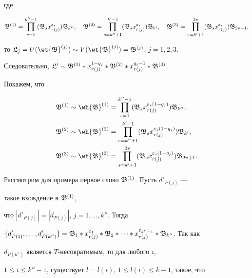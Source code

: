 где


$$


\frak B^{(1)}=\prod^{k''-1}_{s=1}(\frak B_s x^{\varepsilon_s}_{r(j)})


\frak B_{k''},\quad\frak B^{(2)}=\prod_{s=k''+1}^{k'-1}


(\frak B_s x^{\varepsilon_s}_{r(j)})\frak B_{k'},\quad


\frak B^{(3)}=\prod_{s=k'+1}^{2v}(\frak B_s


x^{\varepsilon_s}_{r(j)})\frak B_{2v+1},


$$


то $\frak L_j=U(\wt{\frak B}^{(j)})\sim


V(\wt{\frak B}^{(j)})=\frak B^{(j)}$, $j=1,2,3$.


Следовательно, $\frak L'\sim\frak B^{(1)}


*x^{1-q_j}_{r(j)}*\frak B^{(2)}*x^{q_j-1}_{r(j)}*\frak B^{(3)}$.


Покажем, что


\begin{align*}


\frak B^{(1)}\sim\wh {\frak B}^{(1)}&=\prod^{k''-1}_{s=1}


(\frak B_s x^{\varepsilon_s(1-q_j)}_{r(j)})\frak B_{k''},\\


\frak B^{(2)}\sim\wh{\frak B}^{(2)}&=


\prod^{k'-1}_{s=k''+1}(\frak B_s x^{\varepsilon_s(1-q_j)}_{r(j)})\frak B_{k'},\\


\frak B^{(3)}\sim\wh{\frak B}^{(3)}&=


\prod_{s=k'+1}^{2v}(\frak B_s x^{\varepsilon_s(1-q_j)}_{r(j)})\frak B_{2v+1}.


\end{align*}


Рассмотрим для примера первое слово $\frak B^{(1)}$. Пусть $d'_{P(j)}$ ---


такое вхождение в $\frak B^{(1)}$,


что $|d'_{P(j)}|=|d_{P(j)}|$, $j=1,\dotsc,k''$. Тогда


$\{d'_{P(1)},\dotsc,d'_{P(k'')}\}=\frak B_1 *


x^{\varepsilon_1}_{r(j)}*\frak B_2 *\dotsb*


x^{\varepsilon_{k'' -1}}_{r(j)}*\frak B_{k''}$. Так как


$d_{P(k'')}$ является $T$-несократимым, то для любого $i$,


$1\le i\le k''-1$, существует $l=l(i)$, $1\le l(i)\le k-1$, такое, что


